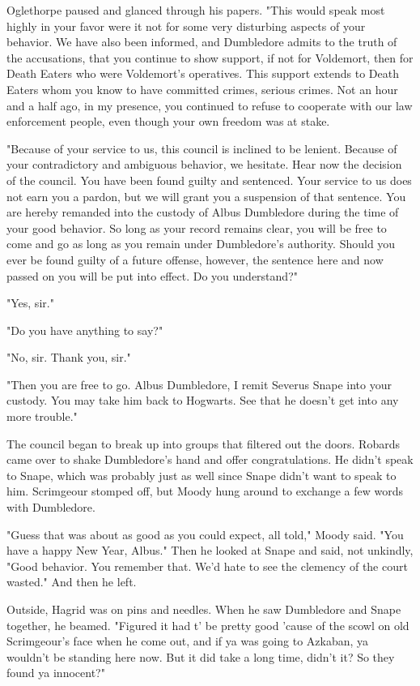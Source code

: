 \documentclass[a4paper,11pt]{article}
\begin{document}
Oglethorpe paused and glanced through his papers. "This would speak most highly in your favor were it not for some very disturbing aspects of your behavior. We have also been informed, and Dumbledore admits to the truth of the accusations, that you continue to show support, if not for Voldemort, then for Death Eaters who were Voldemort's operatives. This support extends to Death Eaters whom you know to have committed crimes, serious crimes. Not an hour and a half ago, in my presence, you continued to refuse to cooperate with our law enforcement people, even though your own freedom was at stake.

"Because of your service to us, this council is inclined to be lenient. Because of your contradictory and ambiguous behavior, we hesitate. Hear now the decision of the council. You have been found guilty and sentenced. Your service to us does not earn you a pardon, but we will grant you a suspension of that sentence. You are hereby remanded into the custody of Albus Dumbledore during the time of your good behavior. So long as your record remains clear, you will be free to come and go as long as you remain under Dumbledore's authority. Should you ever be found guilty of a future offense, however, the sentence here and now passed on you will be put into effect. Do you understand?"

"Yes, sir."

"Do you have anything to say?"

"No, sir. Thank you, sir."

"Then you are free to go. Albus Dumbledore, I remit Severus Snape into your custody. You may take him back to Hogwarts. See that he doesn't get into any more trouble."

The council began to break up into groups that filtered out the doors. Robards came over to shake Dumbledore's hand and offer congratulations. He didn't speak to Snape, which was probably just as well since Snape didn't want to speak to him. Scrimgeour stomped off, but Moody hung around to exchange a few words with Dumbledore.

"Guess that was about as good as you could expect, all told," Moody said. "You have a happy New Year, Albus." Then he looked at Snape and said, not unkindly, "Good behavior. You remember that. We'd hate to see the clemency of the court wasted." And then he left.

Outside, Hagrid was on pins and needles. When he saw Dumbledore and Snape together, he beamed. "Figured it had t' be pretty good 'cause of the scowl on old Scrimgeour's face when he come out, and if ya was going to Azkaban, ya wouldn't be standing here now. But it did take a long time, didn't it? So they found ya innocent?"
\end{document}
